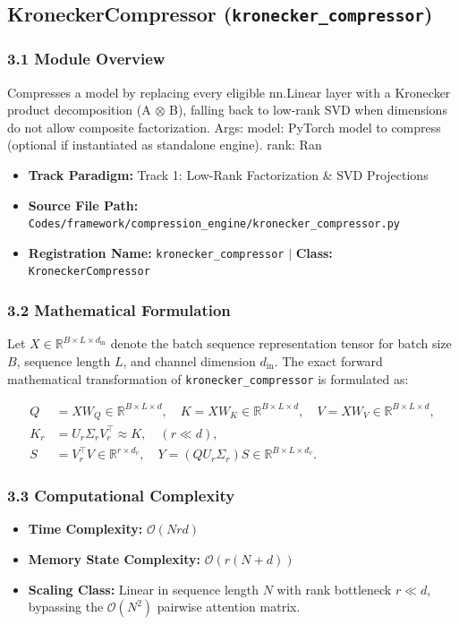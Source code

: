 \subsection{KroneckerCompressor (\texttt{kronecker\_compressor})}
\label{sec:app_module_kronecker\_compressor}

\subsubsection*{3.1 Module Overview}
Compresses a model by replacing every eligible nn.Linear layer with a Kronecker product decomposition (A $\otimes$ B), falling back to low-rank SVD when dimensions do not allow composite factorization.  Args:     model: PyTorch model to compress (optional if instantiated as standalone engine).     rank: Ran
\begin{itemize}
    \item \textbf{Track Paradigm:} Track 1: Low-Rank Factorization & SVD Projections
    \item \textbf{Source File Path:} \texttt{Codes/framework/compression\_engine/kronecker\_compressor.py}
    \item \textbf{Registration Name:} \texttt{kronecker\_compressor} $\mid$ \textbf{Class:} \texttt{KroneckerCompressor}
\end{itemize}

\subsubsection*{3.2 Mathematical Formulation}
Let $X \in \mathbb{R}^{B \times L \times d_{\text{in}}}$ denote the batch sequence representation tensor for batch size $B$, sequence length $L$, and channel dimension $d_{\text{in}}$. The exact forward mathematical transformation of \texttt{kronecker\_compressor} is formulated as:

\begin{align}
Q &= X W_Q \in \mathbb{R}^{B \times L \times d}, \quad K = X W_K \in \mathbb{R}^{B \times L \times d}, \quad V = X W_V \in \mathbb{R}^{B \times L \times d}, \\
K_r &= U_r \Sigma_r V_r^\top \approx K, \quad (r \ll d), \\
S &= V_r^\top V \in \mathbb{R}^{r \times d_v}, \quad Y = (Q U_r \Sigma_r) S \in \mathbb{R}^{B \times L \times d_v}.
\end{align}


\subsubsection*{3.3 Computational Complexity}
\begin{itemize}
    \item \textbf{Time Complexity:} $\mathcal{O}(N r d)$
    \item \textbf{Memory State Complexity:} $\mathcal{O}(r(N + d))$
    \item \textbf{Scaling Class:} Linear in sequence length $N$ with rank bottleneck $r \ll d$, bypassing the $\mathcal{O}(N^2)$ pairwise attention matrix.
\end{itemize}

